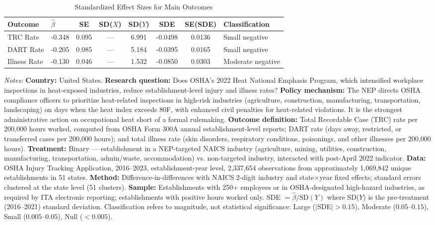 \begin{table}[H]
\centering
\caption{Standardized Effect Sizes for Main Outcomes}
\label{tab:sde}
\small
\begin{threeparttable}
\begin{tabular}{llcccccl}
\toprule
Outcome & $\hat{\beta}$ & SE & SD($X$) & SD($Y$) & SDE & SE(SDE) & Classification \\
\midrule
TRC Rate & -0.348 & 0.095 & --- & 6.991 & -0.0498 & 0.0136 & Small negative \\
DART Rate & -0.205 & 0.085 & --- & 5.184 & -0.0395 & 0.0165 & Small negative \\
Illness Rate & -0.130 & 0.046 & --- & 1.532 & -0.0850 & 0.0303 & Moderate negative \\
\bottomrule
\end{tabular}
\begin{tablenotes}[flushleft]
\footnotesize
\item \textit{Notes:} \textbf{Country:} United States. \textbf{Research question:} Does OSHA's 2022 Heat National Emphasis Program, which intensified workplace inspections in heat-exposed industries, reduce establishment-level injury and illness rates? \textbf{Policy mechanism:} The NEP directs OSHA compliance officers to prioritize heat-related inspections in high-risk industries (agriculture, construction, manufacturing, transportation, landscaping) on days when the heat index exceeds 80\textdegree F, with enhanced civil penalties for heat-related violations. It is the strongest administrative action on occupational heat short of a formal rulemaking. \textbf{Outcome definition:} Total Recordable Case (TRC) rate per 200,000 hours worked, computed from OSHA Form 300A annual establishment-level reports; DART rate (days away, restricted, or transferred cases per 200,000 hours); and total illness rate (skin disorders, respiratory conditions, poisonings, and other illnesses per 200,000 hours). \textbf{Treatment:} Binary --- establishment in a NEP-targeted NAICS industry (agriculture, mining, utilities, construction, manufacturing, transportation, admin/waste, accommodation) vs. non-targeted industry, interacted with post-April 2022 indicator. \textbf{Data:} OSHA Injury Tracking Application, 2016--2023, establishment-year level, 2,337,654 observations from approximately 1,069,842 unique establishments in 51 states. \textbf{Method:} Difference-in-differences with NAICS 2-digit industry and state$\times$year fixed effects; standard errors clustered at the state level (51 clusters). \textbf{Sample:} Establishments with 250+ employees or in OSHA-designated high-hazard industries, as required by ITA electronic reporting; establishments with positive hours worked only. SDE $= \hat{\beta} / \text{SD}(Y)$ where SD($Y$) is the pre-treatment (2016--2021) standard deviation. Classification refers to magnitude, not statistical significance: Large ($|$SDE$| > 0.15$), Moderate ($0.05$--$0.15$), Small ($0.005$--$0.05$), Null ($< 0.005$).
\end{tablenotes}
\end{threeparttable}
\end{table}

